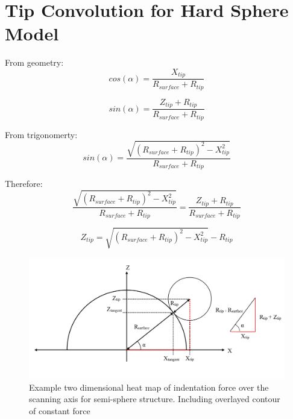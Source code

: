 \newpage 
\section{Tip Convolution for Hard Sphere Model \label{Appendix: Tip Convolution for Hard Sphere Model}}

From geometry:
\begin{equation}
cos(\alpha) = \frac{X_{tip}}{R_{surface}+R_{tip} }
\end{equation}

\begin{equation}
sin(\alpha) = \frac{Z_{tip}+R_{tip}}{R_{surface}+R_{tip}} \end{equation}


From trigonomerty:
\begin{equation}
sin(\alpha) = \frac{\sqrt{(R_{surface}+R_{tip})^2-X_{tip}^2}}{R_{surface}+R_{tip} }
\end{equation}

Therefore:
\begin{equation} \frac{\sqrt{(R_{surface}+R_{tip})^2-X_{tip}^2}}{R_{surface}+R_{tip}} = \frac{Z_{tip}+R_{tip}}{R_{surface}+R_{tip}} 
\end{equation}

\begin{equation}
Z_{tip} = \sqrt{(R_{surface}+R_{tip})^2-X_{tip}^2} - R_{tip}
\end{equation}

\begin{figure}[H]
    \centering
    \includegraphics[width=1\linewidth]{Figures/TipConvolution Diagram-1.png}
    \caption{\label{fig: TipConvolution Diagram} Example two dimensional heat map of indentation force over the scanning axis for semi-sphere structure. Including overlayed contour of constant force }
\end{figure}